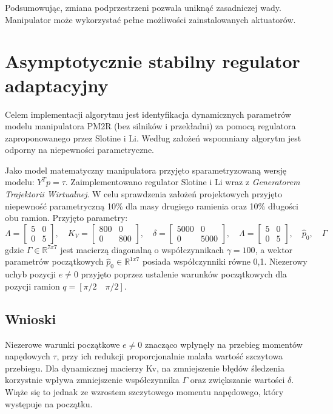 \documentclass[12pt, a4paper, polish]{article}
\begin{document}
Podsumowując, zmiana podprzestrzeni pozwala uniknąć zasadniczej wady. Manipulator może wykorzystać pełne możliwości zainstalowanych aktuatorów.

\section{Asymptotycznie stabilny regulator adaptacyjny}
Celem implementacji algorytmu jest identyfikacja dynamicznych parametrów modelu manipulatora PM2R (bez silników i przekładni) za pomocą regulatora zaproponowanego przez Slotine i Li. Według założeń wspomniany algorytm jest odporny na niepewności parametryczne.

Jako model matematyczny manipulatora przyjęto sparametryzowaną wersję modelu: $Y^Tp=\tau$. Zaimplementowano regulator Slotine i Li wraz z \textit{Generatorem Trajektorii Wirtualnej}. W celu sprawdzenia założeń projektowych przyjęto niepewność parametryczną 10\% dla masy drugiego ramienia oraz 10\% długości obu ramion. Przyjęto parametry:\begin{equation}
\Lambda=\begin{bmatrix}5 & 0 \\ 0 & 5\end{bmatrix},\quad K_V=\begin{bmatrix}800 & 0 \\ 0 & 800\end{bmatrix}, \quad \delta=\begin{bmatrix}5000 & 0 \\ 0 & 5000\end{bmatrix},\quad \Lambda=\begin{bmatrix}5 & 0 \\ 0 & 5\end{bmatrix},\quad \hat{p}_0,\quad\Gamma\end{equation}
gdzie $\Gamma \in \mathbb{R}^{7x7}$ jest macierzą diagonalną o współczynnikach $\gamma=100$, a wektor parametrów początkowych $\hat{p}_0\in\mathbb{R}^{1x7}$ posiada współczynniki równe 0,1. Niezerowy uchyb pozycji $e\neq0$ przyjęto poprzez ustalenie warunków początkowych dla pozycji ramion $q=[\pi/2\quad \pi/2]$. 

\subsection{Wnioski}
Niezerowe warunki początkowe $e\neq0$ znacząco wpłynęły na przebieg momentów napędowych $\tau$, przy ich redukcji proporcjonalnie malała wartość szczytowa przebiegu. 
Dla dynamicznej macierzy Kv, na zmniejszenie błędów śledzenia korzystnie wpływa zmniejszenie współczynnika $\Gamma$ oraz zwiększanie wartości $\delta$. Wiąże się to jednak ze wzrostem szczytowego momentu napędowego, który występuje na początku.
\end{document}

